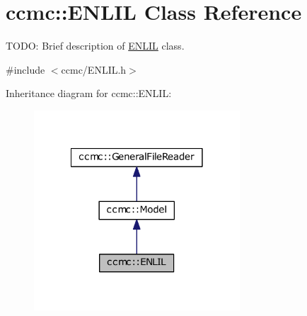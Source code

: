 \hypertarget{classccmc_1_1_e_n_l_i_l}{\section{ccmc\-:\-:E\-N\-L\-I\-L Class Reference}
\label{classccmc_1_1_e_n_l_i_l}
}


T\-O\-D\-O\-: Brief description of \hyperlink{classccmc_1_1_e_n_l_i_l}{E\-N\-L\-I\-L} class.  




{\ttfamily \#include $<$ccmc/\-E\-N\-L\-I\-L.\-h$>$}



Inheritance diagram for ccmc\-:\-:E\-N\-L\-I\-L\-:
\nopagebreak
\begin{figure}[H]
\begin{center}
\leavevmode
\includegraphics[width=218pt]{classccmc_1_1_e_n_l_i_l__inherit__graph}
\end{center}
\end{figure}


